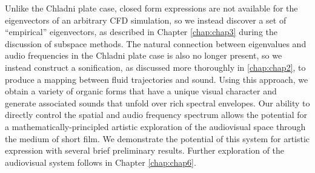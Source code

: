 Unlike the Chladni plate case, closed form expressions are not available for the eigenvectors of an arbitrary CFD simulation, so we instead discover a set of ``empirical'' eigenvectors, as described in Chapter 
\ref{chap:chap3} during the discussion of subspace methods. The natural connection between eigenvalues and audio frequencies in the Chladni plate case is also no longer present, so we instead construct a sonification, as discussed more thoroughly in \ref{chap:chap2}, to produce a mapping between fluid trajectories and sound. Using this approach, we obtain a variety of organic forms that have a unique visual character and generate associated sounds that unfold over rich spectral envelopes. Our ability to directly control the spatial and audio frequency spectrum allows the potential for a mathematically-principled artistic exploration of the audiovisual space through the medium of short film. We demonstrate the potential of this system for artistic expression with several brief preliminary results. Further exploration of the audiovisual system follows in Chapter \ref{chap:chap6}.




